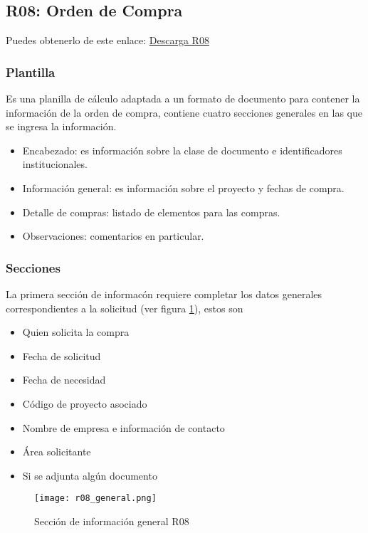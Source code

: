 \subsection*{R08: Orden de Compra}

Puedes obtenerlo de este enlace: \href{https://www.mediafire.com/?zgg9tstpdfm6fqi}{Descarga R08}

\subsubsection{Plantilla}

Es una planilla de cálculo adaptada a un formato de documento para contener la información de la orden de compra, contiene cuatro secciones generales en las que se ingresa la información.

\begin{itemize}
	\item Encabezado: es información sobre la clase de documento e identificadores institucionales.
	\item Información general: es información sobre el proyecto y fechas de compra.
	\item Detalle de compras: listado de elementos para las compras.
	\item Observaciones: comentarios en particular.
\end{itemize}

\subsubsection{Secciones}

La primera sección de informacón requiere completar los datos generales correspondientes a la solicitud (ver figura \ref{general_r08}), estos son 

\begin{itemize}
	\item Quien solicita la compra
	\item Fecha de solicitud
	\item Fecha de necesidad
	\item Código de proyecto asociado
	\item Nombre de empresa e información de contacto
	\item Área solicitante
	\item Si se adjunta algún documento
\end{itemize}

\begin{figure}
	\centering
	\texttt{[image: r08\_general.png]}
	\caption{Sección de información general R08}
	\label{general_r08}
\end{figure}

